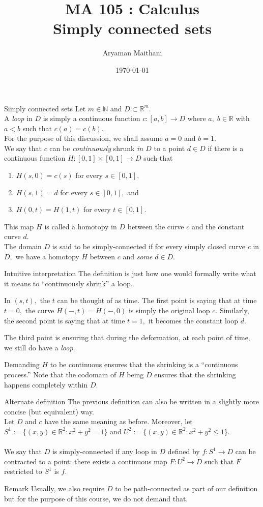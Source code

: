 \documentclass[handout, aspectratio=169]{beamer}
\title{MA 105 : Calculus\\ Simply connected sets}  %
\author{Aryaman Maithani}
\date{\today}               %
\institute[IITB]{IIT Bombay}
\begin{document}
\begin{frame}
	\titlepage
\end{frame}
\begin{frame}{Simply connected sets}
	Let $m \in \mathbb{N}$ and $D \subset \mathbb{R}^m.$\\
	A \emph{loop} in $D$ is simply a continuous function $c:[a, b]\to D$ where $a,\;b\in\mathbb{R}$ with $a < b$ such that $c(a) = c(b).$\\
	For the purpose of this discussion, we shall assume $a = 0$ and $b = 1.$\\
	We say that $c$ can be \emph{continuously} shrunk \emph{in $D$} to a point $d \in D$ if there is a continuous function $H:[0, 1]\times[0, 1]\to D$ such that
	\begin{enumerate} 
		\item $H(s, 0) = c(s)$ for every $s \in [0, 1],$
		\item $H(s, 1) = d$ for every $s \in [0, 1],$ and
		\item $H(0, t) = H(1, t)$ for every $t \in [0, 1].$
	\end{enumerate}
	This map $H$ is called a homotopy in $D$ between the curve $c$ and the constant curve $d.$\\
	The domain $D$ is said to be simply-connected if for every simply closed curve $c$ in $D,$ we have a homotopy $H$ between $c$ and \emph{some} $d \in D.$
\end{frame}
\begin{frame}{Intuitive interpretation}
	The definition is just how one would formally write what it means to ``continuously shrink'' a loop.

	In $(s, t),$ the $t$ can be thought of as time. The first point is saying that at time $t = 0,$ the curve $H(-, t) = H(-, 0)$ is simply the original loop $c.$ Similarly, the second point is saying that at time $t = 1,$ it becomes the constant loop $d.$

	The third point is ensuring that during the deformation, at each point of time, we still do have a \emph{loop}.

	Demanding $H$ to be continuous ensures that the shrinking is a ``continuous process.'' Note that the codomain of $H$ being $D$ ensures that the shrinking happens completely within $D.$
\end{frame}
\begin{frame}{Alternate definition}
	The previous definition can also be written in a slightly more concise (but equivalent) way.\\
	Let $D$ and $c$ have the same meaning as before. Moreover, let $S^1 := \{(x, y) \in \mathbb{R}^2 : x^2 + y^2 = 1\}$ and $U^2 := \{(x, y) \in \mathbb{R}^2 : x^2 + y^2 \le 1\}.$\\~\\
	We say that $D$ is simply-connected if any loop in $D$ defined by $f:S^1 \to D$ can be contracted to a point: there exists a continuous map $F:U^2 \to D$ such that $F$ restricted to $S^1$ is $f.$
\end{frame}
\begin{frame}{Remark}
	Usually, we also require $D$ to be path-connected as part of our definition but for the purpose of this course, we do not demand that.
\end{frame}
\end{document}
